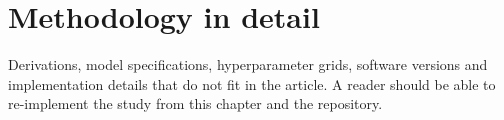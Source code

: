 \chapter{Methodology in detail}

Derivations, model specifications, hyperparameter grids, software versions and implementation details that do not fit in the article. A reader should be able to re-implement the study from this chapter and the repository.
